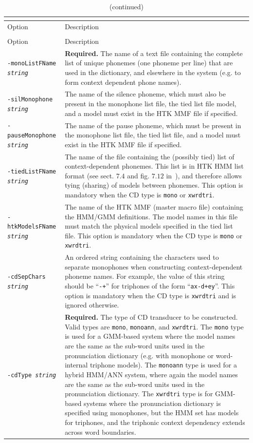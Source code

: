 \documentclass[a4paper,12pt]{report}
\begin{document}
\begin{center}
\begin{longtable}{lp{9cm}}
\caption{Detailed description of {\tt cdgen} command line options.} \\
\label{tab:cdgen_ref} \\
\hline
Option & Description \\
\hline
\endfirsthead
\caption{(continued)} \\
\hline
Option & Description \\
\hline
\endhead
\hline
\endfoot
{\tt -monoListFName \emph{string}} & {\bf Required.} The name of a text file containing the complete list of unique phonemes (one phoneme per line) that are used in the dictionary, and elsewhere in the system (e.g. to form context dependent phone names). \\
{\tt -silMonophone \emph{string}} & The name of the silence phoneme,
which must also be present in the monophone list file, the tied list file model,
and a model must exist in the HTK MMF file if specified. \\
{\tt -pauseMonophone \emph{string}} & The name of the pause phoneme,
which must be present in the monophone list file, the tied list file, and a
model must exist in the HTK MMF file if specified. \\
{\tt -tiedListFName \emph{string}} & The name of the file containing the (possibly tied) list of context-dependent phonemes. This list is in HTK HMM list format (see sect. $7.4$ and fig. $7.12$ in~\cite{htkbook321}), and therefore allows tying (sharing) of models between phonemes. This option is mandatory when the CD type is {\tt mono} or {\tt xwrdtri}. \\
{\tt -htkModelsFName \emph{string}} & The name of the HTK MMF (master macro file) containing the HMM/GMM definitions. The model names in this file must match the physical models specified in the tied list file. This option is mandatory when the CD type is {\tt mono} or {\tt xwrdtri}. \\
{\tt -cdSepChars \emph{string}} & An ordered string containing the characters used to separate monophones when constructing context-dependent phoneme names. For example, the value of this string should be ``{\tt -+}'' for triphones of the form ``{\tt ax-d+ey}''. This option is mandatory when the CD type is {\tt xwrdtri} and is ignored otherwise. \\
{\tt -cdType \emph{string}} & {\bf Required.} The type of CD transducer to be constructed. Valid types are {\tt mono}, {\tt monoann}, and {\tt xwrdtri}. The {\tt mono} type is used for a GMM-based system where the model names are the same as the sub-word units used in the pronunciation dictionary (e.g. with monophone or word-internal triphone models). The {\tt monoann} type is used for a hybrid HMM/ANN system, where again the model names are the same as the sub-word units used in the pronunciation dictionary. The {\tt xwrdtri} type is for GMM-based systems where the pronunciation dictionary is specified using monophones, but the HMM set has models for triphones, and the triphonic context dependency extends across word boundaries. \\

\end{longtable}
\end{center}
\end{document}
